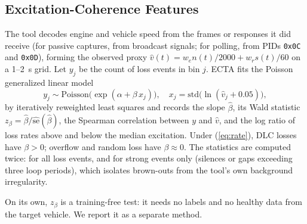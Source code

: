 \subsection{Excitation-Coherence Features}
The tool decodes engine and vehicle speed from the frames or responses it
did receive (for passive captures, from broadcast signals; for polling,
from PIDs \texttt{0x0C} and \texttt{0x0D}), forming the observed proxy
$\hat v(t)=w_e n(t)/2000+w_r s(t)/60$ on a 1--2~s grid. Let $y_j$ be the
count of loss events in bin $j$. ECTA fits the Poisson generalized linear
model~\cite{mccullagh1989}
\begin{equation}
y_j\sim\mathrm{Poisson}\big(\exp(\alpha+\beta\,x_j)\big),\quad
x_j=\mathrm{std}\big(\ln(\hat v_j+0.05)\big),
\label{eq:glm}
\end{equation}
by iteratively reweighted least squares and records the slope
$\hat\beta$, its Wald statistic $z_\beta=\hat\beta/\widehat{\mathrm{se}}(\hat\beta)$,
the Spearman correlation between $y$ and $\hat v$, and the log ratio of
loss rates above and below the median excitation. Under (\ref{eq:rate}),
DLC losses have $\beta>0$; overflow and random loss have $\beta\approx0$.
The statistics are computed twice: for all loss events, and for strong
events only (silences or gaps exceeding three loop periods), which isolates
brown-outs from the tool's own background irregularity.

On its own, $z_\beta$ is a training-free test: it needs no labels and no
healthy data from the target vehicle. We report it as a separate method.


